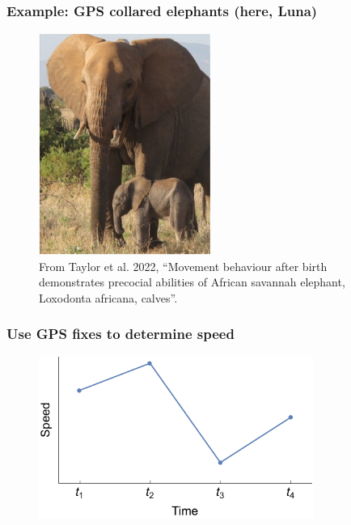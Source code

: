 \documentclass[main.tex]{subfiles}
\begin{document}
\begin{frame}
\frametitle{Example: GPS collared elephants (here, Luna)}

\begin{figure}
    \centering
    \includegraphics[width=0.5\textwidth]{figures/luna.jpg}
    \caption{From Taylor et al. 2022, ``Movement behaviour after birth demonstrates precocial abilities of African savannah elephant, Loxodonta africana, calves''.}
\end{figure}
    
\end{frame}

\begin{frame}
\frametitle{Use GPS fixes to determine speed}

\begin{figure}
    \centering
    \includegraphics[width=0.8\textwidth]{figures/hmm_time_series.pdf}
\end{figure}
    
\end{frame}
\end{document}
